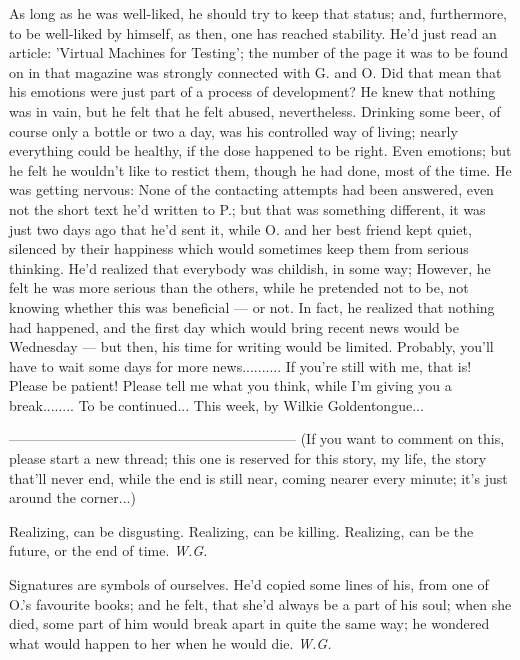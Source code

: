 As long as he was well-liked, he should try to keep that status; and, furthermore, to be well-liked by himself, as then, one has reached stability. 
He'd just read an article: 'Virtual Machines for Testing'; the number of the page it was to be found on in that magazine was strongly connected with G. and O. Did that mean that his emotions were just part of a process of development? He knew that nothing was in vain, but he felt that he felt abused, nevertheless. 
Drinking some beer, of course only a bottle or two a day, was his controlled way of living; nearly everything could be healthy, if the dose happened to be right. Even emotions; but he felt he wouldn't like to restict them, though he had done, most of the time. 
He was getting nervous: None of the contacting attempts had been answered, even not the short text he'd written to P.; but that was something different, it was just two days ago that he'd sent it, while O. and her best friend kept quiet, silenced by their happiness which would sometimes keep them from serious thinking. He'd realized that everybody was childish, in some way; However, he felt he was more serious than the others, while he pretended not to be, not knowing whether this was beneficial --- or not. 
In fact, he realized that nothing had happened, and the first day which would bring recent news would be Wednesday --- but then, his time for writing would be limited. Probably, you'll have to wait some days for more news..........
If you're still with me, that is!
Please be patient!
Please tell me what you think, while I'm giving you a break........
To be continued...
This week, by Wilkie Goldentongue...

--------------------------------------------------------------
(If you want to comment on this, please start a new thread; this one is reserved for this story, my life, the story that'll never end, while the end is still near, coming nearer every minute; it's just around the corner...)

Realizing, 
can be disgusting. 
Realizing, 
can be killing. 
Realizing, 
can be the future, 
or the end 
of time. 
\emph{W.G.}

Signatures 
are symbols of ourselves. 
He'd copied some lines 
of his, 
from one of O.'s favourite books; 
and he felt, 
that she'd always be a part 
of his soul; 
when she died, 
some part of him 
would break apart 
in quite the same way; 
he wondered what would happen to her 
when he would die. 
\emph{W.G.}

